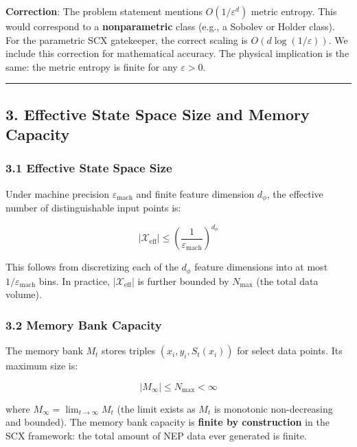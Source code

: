 \documentclass[
  12pt,
]{ctexart}
\begin{document}
\textbf{Correction}: The problem statement mentions
\(O(1/\varepsilon^d)\) metric entropy. This would correspond to a
\textbf{nonparametric} class (e.g., a Sobolev or Holder class). For the
parametric SCX gatekeeper, the correct scaling is
\(O(d \log(1/\varepsilon))\). We include this correction for
mathematical accuracy. The physical implication is the same: the metric
entropy is finite for any \(\varepsilon > 0\).

\begin{center}\rule{0.5\linewidth}{0.5pt}\end{center}

\subsection{3. Effective State Space Size and Memory
Capacity}\label{effective-state-space-size-and-memory-capacity}

\subsubsection{3.1 Effective State Space
Size}\label{effective-state-space-size}

Under machine precision \(\varepsilon_{\text{mach}}\) and finite feature
dimension \(d_\phi\), the effective number of distinguishable input
points is:

\[|\mathcal{X}_{\text{eff}}| \leq \left( \frac{1}{\varepsilon_{\text{mach}}} \right)^{d_\phi}\]

This follows from discretizing each of the \(d_\phi\) feature dimensions
into at most \(1/\varepsilon_{\text{mach}}\) bins. In practice,
\(|\mathcal{X}_{\text{eff}}|\) is further bounded by \(N_{\text{max}}\)
(the total data volume).

\subsubsection{3.2 Memory Bank Capacity}\label{memory-bank-capacity}

The memory bank \(M_t\) stores triples \((x_i, y_i, S_t(x_i))\) for
select data points. Its maximum size is:

\[|M_\infty| \leq N_{\text{max}} < \infty\]

where \(M_\infty = \lim_{t\to\infty} M_t\) (the limit exists as \(M_t\)
is monotonic non-decreasing and bounded). The memory bank capacity is
\textbf{finite by construction} in the SCX framework: the total amount
of NEP data ever generated is finite.
\end{document}
